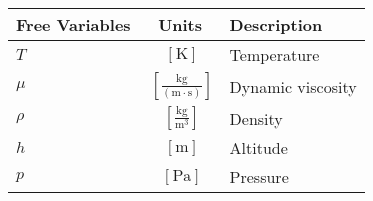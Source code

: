 % 

{\footnotesize
\begin{longtable}{lcl}
\toprule
Free Variables & Units & Description \\ \midrule
$T$ & $~\mathrm{[K]}$ & Temperature \\
$\mu$ & $~\mathrm{[\tfrac{kg}{\left(m\cdot s\right)}]}$ & Dynamic viscosity \\
$\rho$ & $~\mathrm{[\tfrac{kg}{m^{3}}]}$ & Density \\
$h$ & $~\mathrm{[m]}$ & Altitude \\
$p$ & $~\mathrm{[Pa]}$ & Pressure \\
\bottomrule
\end{longtable}}

% 
